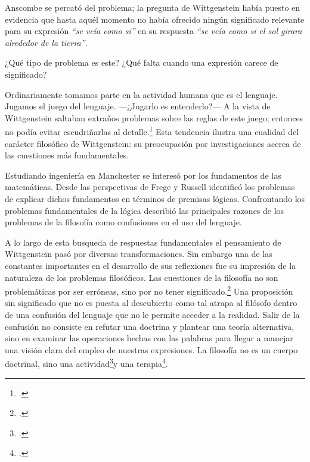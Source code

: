 
Anscombe se percató del problema; la pregunta de Wittgenstein había puesto en
evidencia que hasta aquél momento no había ofrecido ningún significado relevante
para su expresión \emph{``se veía como si''} en su respuesta \emph{``se veía
    como si el sol girara alrededor de la tierra''}. 
 
¿Qué tipo de problema es este? 
¿Qué falta cuando una expresión carece de significado?

Ordinariamente tomamos parte en la actividad humana que es el
lenguaje. Jugamos el juego del lenguaje. ---¿Jugarlo es entenderlo?--- 
A la vista de Wittgenstein saltaban extraños problemas sobre las reglas de este
juego; entonces no podía evitar escudriñarlas al
detalle.\footcite[cf.~][loc.7099]{monk} 
Esta tendencia ilustra una cualidad del carácter filosófico de Wittgenstein: su
preocupación por investigaciones acerca de las cuestiones más fundamentales. 

Estudiando ingeniería en Manchester se interesó por los fundamentos de las
matemáticas. Desde las perspectivas de Frege y Russell identificó los problemas
de explicar dichos fundamentos en términos de premisas lógicas. 
Confrontando los problemas fundamentales de la lógica 
describió las principales razones de los problemas de la filosofía como
confusiones en el uso del lenguaje. 

A lo largo de esta busqueda de respuestas fundamentales el pensamiento de
Wittgenstein pasó por diversas transformaciones. Sin embargo una de las
constantes importantes en el desarrollo de sus reflexiones fue su impresión de
la naturaleza de los problemas filosóficos.
Las cuestiones de la filosofía no son problemáticas por ser erróneas, sino por
no tener significado.\footcite[cf.~][4.003]{tractatus} Una proposición sin
significado que no es puesta al descubierto como tal
atrapa al filósofo dentro de una confusión del lenguaje que no le permite
acceder a la realidad. Salir de la confusión no consiste en refutar una doctrina
y plantear una teoría alternativa, sino en examinar las operaciones hechas con
las palabras para llegar a manejar una visión clara del empleo de nuestras
expresiones. La filosofía no es un cuerpo doctrinal, sino una
actividad\footcite[cf.~][4.112]{tractatus}y una
terapia\footcite[cf.~][\S133]{PI}.   

